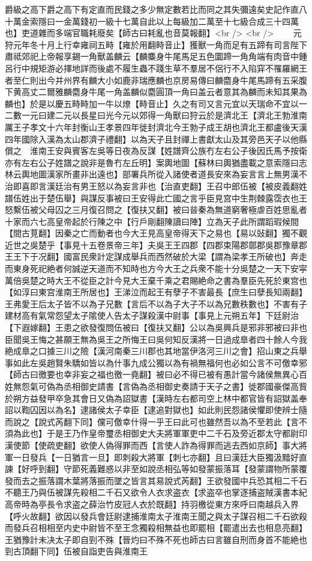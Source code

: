 爵級之高下爵之高下有定直而民錢之多少無定數若比而同之其失彌遠矣史記作直八十萬金索隱曰一金萬錢初一級十七萬自此以上每級加二萬至十七級合成三十四萬也】吏道雜而多端官職耗廢矣【師古曰耗亂也音莫報翻】<br />
<br />
　　元狩元年冬十月上行幸雍祠五畤【雍於用翻畤音止】獲獸一角而足有五蹄有司言陛下肅祗郊祀上帝報享錫一角獸盖麟云【麟麋身牛尾馬足五色圜蹄一角角端有肉音中鍾呂行中規矩游必擇地詳而後處不履生蟲不踐生草不羣居不侶行不入陷穽不罹羅網王者至仁則出今并州界有麟大小如鹿非瑞應麟也京房易傳曰麟麕身牛尾馬蹄有五采腹下黄高丈二爾雅麟麕身牛尾一角盖麟似麕圓頂一角曰盖云者意其為麟而未知其果為麟也】於是以慶五畤畤加一牛以燎【畤音止】久之有司又言元宜以天瑞命不宜以一二數一元曰建二元以長星曰光今元以郊得一角獸曰狩云於是濟北王【濟北王勃淮南厲王子孝文十六年封衡山王孝景四年徙封濟北今王勃子成王胡也濟北王都盧後天漢四年國除入漢為太山郡濟子禮翻】以為天子且封禪上書獻太山及其旁邑天子以他縣償之　淮南王安與賓客左吳等日夜為反謀【姓譜齊公族冇左右公子後因氏馬予按衛亦有左右公子姓譜之說非是魯冇左丘明】案輿地圖【蘇林曰輿猶盡載之意索隱曰志林云輿地圖漢家所畫非出遠也】部署兵所從入諸使者道長安來為妄言言上無男漢不治即喜即言漢廷治有男王怒以為妄言非也【治直吏翻】王召中郎伍被【被皮義翻姓譜伍姓出于楚伍舉】與謀反事被曰王安得此亡國之言乎臣見宫中生荆棘露霑衣也王怒繫伍被父母囚之三月復召問之【復扶又翻】被曰㫺秦為無道窮奢極虐百姓思亂者十家而六七高皇帝起於行陳之中【行戶剛翻陳讀曰陣】立為天子此所謂蹈瑕候間【間古莧翻】因秦之亡而動者也今大王見高皇帝得天下之易也【易以䜴翻】獨不觀近世之吳楚乎【事見十五卷景帝三年】夫吳王王四郡【四郡束陽郡鄣郡吳郡豫章郡王王下于况翻】國富民衆計定謀成舉兵而西然破於大梁【謂為梁孝王所破也】奔走而東身死祀絶者何誠逆天道而不知時也方今大王之兵衆不能十分吳楚之一天下安寜萬倍吳楚之時大王不從臣之計今見大王棄千乘之君賜絶命之書為羣臣先死於東宫也【如淳曰東宫淮南王所居也】王涕泣而起王有孽子不害最長【庶生曰孽長知兩翻】王弗愛王后太子皆不以為子兄數【言后不以為子大子不以為兄數秩數也】不害有子建材高有氣常怨望太子隂使人告太子謀殺漢中尉事【事見上元朔五年】下廷尉治【下遐嫁翻】王患之欲發復問伍被曰【復扶又翻】公以為吳興兵是邪非邪被曰非也臣聞吳王悔之甚願王無為吳王之所悔王曰吳何知反漢將一日過成臯者四十餘人今我絶成臯之口據三川之險【漢河南秦三川郡也其地當伊洛河三川之會】招山東之兵舉事如此左吳趙賢朱驕如皆以為什事九成公獨以為有禍無福何也必如公言不可儌幸邪【師古曰徼要也幸非妄之福也徼一堯翻】被曰必不得已被有愚計當今諸侯無異心百姓無怨氣可偽為丞相御史請書【言偽為丞相御史奏請于天子之書】徙郡國豪傑高貲於朔方益發甲卒急其會日又偽為詔獄書【漢時左右都司空上林中都官皆有詔獄盖奉詔以鞫囚因以為名】逮諸侯太子幸臣【逮追對獄也】如此則民怨諸侯懼即使辨士隨而說之【說式芮翻下同】儻可儌幸什得一乎王曰此可也雖然吾以為不至若此【言不須為此也】于是王乃作皇帝璽丞相御史大夫將軍軍吏中二千石及旁近郡太守都尉印漢使節【使疏吏翻】欲使人偽得罪而西【言使人詐為得罪而逃去西如京師】事大將軍一日發兵【一日猶言一旦】即刺殺大將軍【刺七亦翻】且曰漢廷大臣獨汲黯好直諫【好呼到翻】守節死義難惑以非至如說丞相弘等如發蒙振落耳【發蒙謂物所蒙覆發而去之振落謂木葉將落振而墜之皆言其易說式芮翻】王欲發國中兵恐其相二千石不聽王乃與伍被謀先殺相二千石又欲令人衣求盗衣【求盗卒也掌逐捕盗賊漢書本紀高帝時為亭長令求盗之薛治竹皮冠人衣於既翻】持羽檄從東方來呼曰南越兵入界【呼火故翻】欲因以發兵會廷尉逮捕淮南太子淮南王聞之與太子謀召相二千石欲殺而發兵召相相至内史中尉皆不至王念獨殺相無益也即罷相【罷遣出去也相息亮翻】王猶豫計未决太子即自剄不殊【晉灼曰不殊不死也師古曰言雖自刑而身首不能絶也剄古頂翻下同】伍被自詣吏告與淮南王